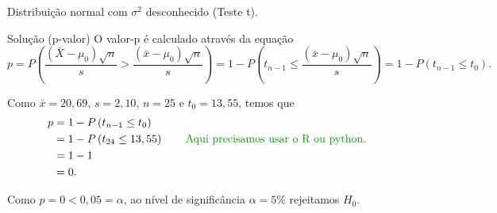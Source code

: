 \documentclass[8pt]{beamer}
\begin{document}
\begin{frame}{Distribuição normal com $\sigma^2$ desconhecido (Teste t).}

\normalsize

\begin{block}{Solução (p-valor)}
	O valor-p é calculado através da equação
	$$p = P\left( \frac{(\bar{X} - \mu_0)\sqrt{n}}{s} > \frac{(\bar{x} - \mu_0)\sqrt{n}}{s} \right) = 1 - P \left( t_{n-1} \leq \frac{(\bar{x} - \mu_0)\sqrt{n}}{s} \right)= 1- P(t_{n-1} \leq t_0).$$
	
	Como $\bar{x}=20,69$, $s=2,10$, $n=25$ e $t_0=13,55$, temos que
	\begin{align*}
		p &=1- P\left( t_{n-1} \leq t_0  \right)\\
		&=1- P \left( t_{24} \leq 13,55 \right)\qquad \mbox{\textcolor{important}{Aqui precisamos usar o R ou python.}}\\
		&=1 - 1\\
		&= 0.
	\end{align*}
	
	Como $p=0 < 0,05=\alpha$, ao nível de significância $\alpha=5\%$ rejeitamos $H_0$.
\end{block}

\normalsize
\end{frame}
\end{document}

